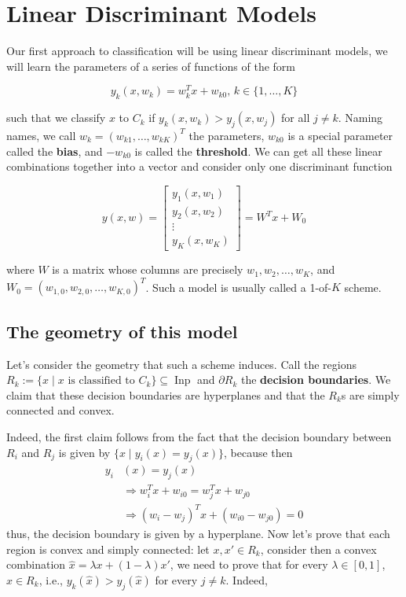 \documentclass{report}
\DeclareMathOperator{\Inp}{Inp}
\begin{document}
\section{Linear Discriminant Models}

Our first approach to classification will be using linear discriminant models, we will learn the parameters of a series of functions of the form

\[y_k(x,w_k) = w_k^Tx + w_{k0},\, k\in\{1,\dots, K\}\]

such that we classify $x$ to $C_k$ if $y_k(x,w_k) > y_j(x,w_j)$ for all $j\neq k$. Naming names, we call $w_k = (w_{k1},\dots, w_{kK})^T$ the parameters, $w_{k0}$ is a special parameter called the \textbf{bias}, and $-w_{k0}$ is called the \textbf{threshold}. We can get all these linear combinations together into a vector and consider only one discriminant function

\[y(x,w) = \begin{bmatrix}
	y_1(x,w_1)\\
	y_2(x,w_2)\\
	\vdots\\
	y_K(x,w_K)
\end{bmatrix} = W^Tx + W_0\]

where $W$ is a matrix whose columns are precisely $w_1, w_2,\dots, w_K$, and $W_0 = (w_{1,0}, w_{2,0},\dots, w_{K,0})^T$. Such a model is usually called a 1-of-$K$ scheme.

\subsection{The geometry of this model}

Let's consider the geometry that such a scheme induces. Call the regions $R_k := \{x\;|\;x \mbox{ is classified to } C_k\}\subseteq \Inp$ and $\partial R_k$ the \textbf{decision boundaries}. We claim that these decision boundaries are hyperplanes and that the $R_k$s are simply connected and convex.

Indeed, the first claim follows from the fact that the decision boundary between $R_i$ and $R_j$ is given by $\{x\;|\;y_i(x) = y_j(x)\}$, because then
\begin{align*}
y_i&(x) = y_j(x)\\
&\Rightarrow w_i^Tx + w_{i0} = w_j^Tx + w_{j0}\\
&\Rightarrow (w_i - w_j)^Tx + (w_{i0} - w_{j0}) = 0
\end{align*}
thus, the decision boundary is given by a hyperplane. Now let's prove that each region is convex and simply connected: let $x,x'\in R_k$, consider then a convex combination $\hat{x} = \lambda x + (1-\lambda)x'$, we need to prove that for every $\lambda\in [0,1]$, $\hat{x}\in R_k$, i.e., $y_k(\hat{x}) > y_j(\hat{x})$ for every $j\neq k$. Indeed,
\end{document}
